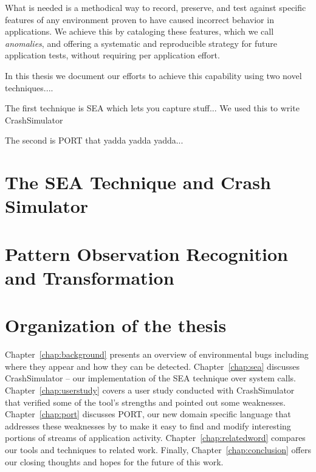 What is needed is a methodical way to record, preserve, and test against
specific features of any environment proven to have caused incorrect
behavior in applications. We achieve this by cataloging these
features, which we call \textit{anomalies}, and
offering a systematic and reproducible strategy for
future application tests, without
requiring per application effort.

In this thesis we document our efforts to achieve this capability using two
novel techniques....

The first technique is SEA which lets you capture stuff...
We used this to write CrashSimulator

The second is PORT that yadda yadda yadda...

\section{The SEA Technique and Crash Simulator}

\section{Pattern Observation Recognition and Transformation}


\section{Organization of the thesis}
\label{sec:organization}
Chapter~\ref{chap:background}
presents an overview of environmental bugs including where they
appear and how they can be detected.
Chapter~\ref{chap:sea}
discusses CrashSimulator -- our implementation of the SEA
technique over system calls.
Chapter~\ref{chap:userstudy}
covers a user study conducted with CrashSimulator that
verified some of the tool's strengths and pointed out some weaknesses.
Chapter~\ref{chap:port}
discusses PORT,
our new domain specific language that addresses these weaknesses by to make
it easy to find and modify interesting portions of streams of
application activity.
Chapter~\ref{chap:relatedword}
compares our tools and techniques to related work.
Finally,
Chapter~\ref{chap:conclusion} offers our closing thoughts and hopes for
the future of this work.
